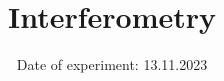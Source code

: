 
\subject{V64}
\title{Interferometry}
\date{%
  Date of experiment: 13.11.2023
}

\maketitle
\thispagestyle{empty}
\tableofcontents
\newpage




\printbibliography{}
\appendix
\newpage

